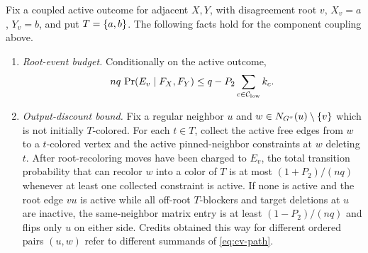 \begin{lemma}\label{lem:cv-component-budgets}
Fix a coupled active outcome for adjacent $X,Y$, with disagreement root
$v$, $X_v=a$, $Y_v=b$, and put $T=\left\{a,b\right\}$. The following facts hold
for the component coupling above.
\begin{enumerate}
\item \emph{Root-event budget.}
  Conditionally on the active outcome,
  \begin{equation}\label{eq:cv-root-recolour-budget}
    nq\,\Pr(E_v\mid F_X,F_Y)
       \le q-P_2\sum_{c\in\mathcal C_{\rm low}}k_c .
  \end{equation}
\item \emph{Output-discount bound.}
  Fix a regular neighbor $u$ and
  $w\in N_{G^\tau}(u)\setminus\left\{v\right\}$ which is not initially
  $T$-colored. For each $t\in T$, collect the active free edges from
  $w$ to a $t$-colored vertex and the active pinned-neighbor constraints at $w$
  deleting $t$. After root-recoloring moves have been charged to
  $E_v$, the total transition probability that can recolor $w$ into a color
  of $T$ is at most $(1+P_2)/(nq)$ whenever at least one collected constraint is
  active. If none is active and the root edge $vu$ is active while all
  off-root $T$-blockers and target deletions at $u$ are inactive, the
  same-neighbor matrix entry is at least $(1-P_2)/(nq)$ and flips only $u$ on
  either side. Credits obtained this way for different ordered pairs
  $(u,w)$ refer to different summands of \eqref{eq:cv-path}.
\end{enumerate}
\end{lemma}

